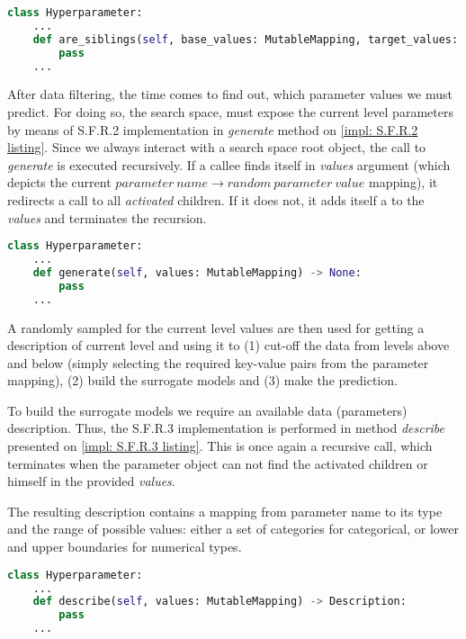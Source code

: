 \begin{lstlisting}[language=Python, caption=S.F.R.1 implementation., label=impl: S.F.R.1 listing]
class Hyperparameter:
	...
    def are_siblings(self, base_values: MutableMapping, target_values: MutableMapping) -> bool:
    	pass
	...
\end{lstlisting}

After data filtering, the time comes to find out, which parameter values we must predict. For doing so, the search space, must expose the current level parameters by means of S.F.R.2 implementation in \emph{generate} method on \cref{impl: S.F.R.2 listing}. Since we always interact with a search space root object, the call to \emph{generate} is executed recursively. If a callee finds itself in \emph{values} argument (which depicts the current $parameter\ name \rightarrow random\ parameter\ value$ mapping), it redirects a call to all \textit{activated} children. If it does not, it adds itself a to the \emph{values} and terminates the recursion.

\begin{lstlisting}[language=Python, caption=S.F.R.2 implementation., label=impl: S.F.R.2 listing]
class Hyperparameter:
	...
    def generate(self, values: MutableMapping) -> None:
    	pass
	...
\end{lstlisting}

A randomly sampled for the current level values are then used for getting a description of current level and using it to (1) cut-off the data from levels above and below (simply selecting the required key-value pairs from the parameter mapping), (2) build the surrogate models and (3) make the prediction.

To build the surrogate models we require an available data (parameters) description. Thus, the S.F.R.3 implementation is performed in method \emph{describe} presented on \cref{impl: S.F.R.3 listing}. This is once again a recursive call, which terminates when the parameter object can not find the activated children or himself in the provided \emph{values}.

The resulting description contains a mapping from parameter name to its type and the range of possible values: either a set of categories for categorical, or lower and upper boundaries for numerical types.

\begin{lstlisting}[language=Python, caption=S.F.R.3 implementation., label=impl: S.F.R.3 listing]
class Hyperparameter:
	...
    def describe(self, values: MutableMapping) -> Description:
    	pass
	...
\end{lstlisting}

